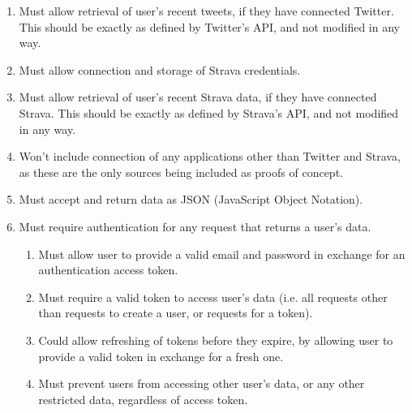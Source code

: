 \documentclass[11pt,openright,a4paper]{report}
\begin{document}
\begin{enumerate}
\item Must allow retrieval of user's recent tweets, if they have connected Twitter. This should be exactly as defined by Twitter's API, and not modified in any way.
\item Must allow connection and storage of Strava credentials.
\item Must allow retrieval of user's recent Strava data, if they have connected Strava. This should be exactly as defined by Strava's API, and not modified in any way.
\item Won't include connection of any applications other than Twitter and Strava, as these are the only sources being included as proofs of concept.
\item Must accept and return data as JSON (JavaScript Object Notation).
\item Must require authentication for any request that returns a user's data.
  \begin{enumerate}
  \item Must allow user to provide a valid email and password in exchange for an authentication access token.
  \item Must require a valid token to access user's data (i.e. all requests other than requests to create a user, or requests for a token).
  \item Could allow refreshing of tokens before they expire, by allowing user to provide a valid token in exchange for a fresh one.
  \item Must prevent users from accessing other user's data, or any other restricted data, regardless of access token.
  \end{enumerate}
\end{enumerate}
\end{document}
